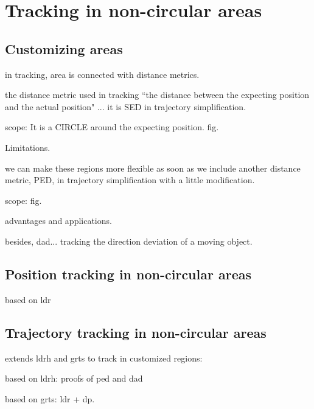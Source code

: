 

\section{Tracking in non-circular areas}
\label{sec:position}


\subsection{Customizing areas}
in tracking, area is connected with distance metrics.

the distance metric used in tracking ``the distance between the expecting position and the actual position" ... it is SED in trajectory simplification. 

scope: It is  a CIRCLE around the expecting position. fig.

Limitations.

we can make these regions more flexible as soon as we include another distance metric, PED, in trajectory simplification with a little modification.

scope: fig.

advantages and applications.

besides, dad... tracking the direction deviation of a moving object.
 
\subsection{Position tracking in non-circular areas}
based on ldr


\subsection{Trajectory tracking in non-circular areas}
extends ldrh and grts to track in customized regions:

based on ldrh: proofs of ped and dad

based on grts: ldr + dp. 
